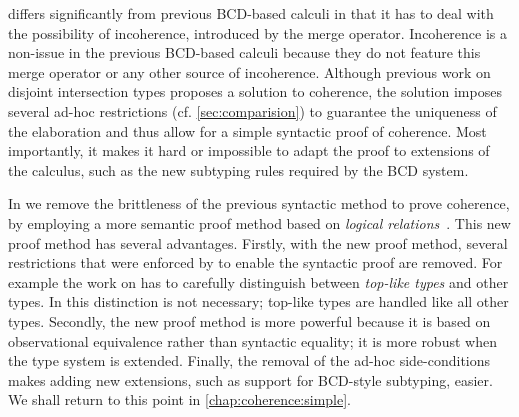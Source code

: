 
\namee differs significantly from previous BCD-based calculi in that it has to
deal with the possibility of incoherence, introduced by the merge operator. Incoherence
is a non-issue in the previous BCD-based calculi because they do not feature
this merge operator or any other source of incoherence.
Although previous work on disjoint intersection types
proposes a solution to coherence, the solution imposes several ad-hoc restrictions (cf. \cref{sec:comparision})
to guarantee the uniqueness of the elaboration and thus allow for a simple
syntactic proof of coherence. Most
importantly, it makes it hard or impossible to adapt the proof to extensions of
the calculus, such as the new subtyping rules required by the BCD system.

In \namee we remove the brittleness of the previous syntactic method to prove
coherence, by employing a more semantic proof method based on \emph{logical
  relations}~\citep{tait, plotkin1973lambda, statman1985logical}. This new proof method has several
advantages. Firstly, with the new proof method, several restrictions that were
enforced by \oname to enable the syntactic proof are removed. For example
the work on \oname has to carefully distinguish between \emph{top-like types} and other types.
In \namee this distinction is not necessary; top-like types are handled like all
other types. Secondly, the new proof method is more powerful because it is based
on observational equivalence rather than syntactic equality; it is more robust
when the type system is extended. Finally, the removal of the ad-hoc
side-conditions makes adding new extensions, such as support for BCD-style
subtyping, easier. We shall return to this point in
\cref{chap:coherence:simple}.





% 



